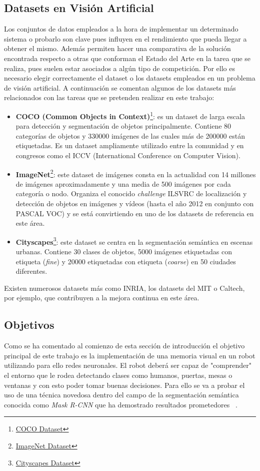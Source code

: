 \documentclass{bmvc2k}
\begin{document}
\subsection{Datasets en Visión Artificial}
Los conjuntos de datos empleados a la hora de implementar un determinado sistema o probarlo son clave pues influyen en el rendimiento que pueda llegar a obtener el mismo. Además permiten hacer una comparativa de la solución encontrada respecto a otras que conforman el Estado del Arte en la tarea que se realiza, pues suelen estar asociados a algún tipo de competición. Por ello es necesario elegir correctamente el dataset o los datasets empleados en un problema de visión artificial. A continuación se comentan algunos de los datasets más relacionados con las tareas que se pretenden realizar en este trabajo:
\begin{itemize}
\item \textbf{COCO (Common Objects in Context)}\footnote {\href{http://cocodataset.org/#home}{COCO Dataset}}: es un dataset de larga escala para detección y segmentación de objetos principalmente. Contiene 80 categorías de objetos y 330000 imágenes de las cuales más de 200000 están etiquetadas. Es un dataset ampliamente utilizado entre la comunidad y en congresos como el ICCV (International Conference on Computer Vision).
\item \textbf{ImageNet}\footnote {\href{http://www.image-net.org/}{ImageNet Dataset}}: este dataset de imágenes consta en la actualidad con 14 millones de imágenes aproximadamente y una media de 500 imágenes por cada categoría o nodo. Organiza el conocido \textit{challenge} ILSVRC de localización y detección de objetos en imágenes y vídeos (hasta el año 2012 en conjunto con PASCAL VOC) y se está convirtiendo en uno de los datasets de referencia en este área.
\item \textbf{Cityscapes}\footnote {\href{https://www.cityscapes-dataset.com/}{Cityscapes Dataset}}: este dataset se centra en la segmentación semántica en escenas urbanas. Contiene 30 clases de objetos, 5000 imágenes etiquetadas con etiqueta  (\textit{fine}) y 20000 etiquetadas con etiqueta  (\textit{coarse}) en 50 ciudades diferentes.
\end{itemize}
Existen numerosos datasets más como INRIA, los datasets del MIT o Caltech, por ejemplo, que contribuyen a la mejora continua en este área.

\subsection{Objetivos}
Como se ha comentado al comienzo de esta sección de introducción el objetivo principal de este trabajo es la implementación de una memoria visual en un robot utilizando para ello redes neuronales. El robot deberá ser capaz de "comprender" el entorno que le rodea detectando clases como humanos, puertas, mesas o ventanas y con esto poder tomar buenas decisiones. Para ello se va a probar el uso de una técnica novedosa dentro del campo de la segmentación semántica conocida como \textit{Mask R-CNN} que ha demostrado resultados prometedores ~\cite{he2017mask}.
\end{document}
